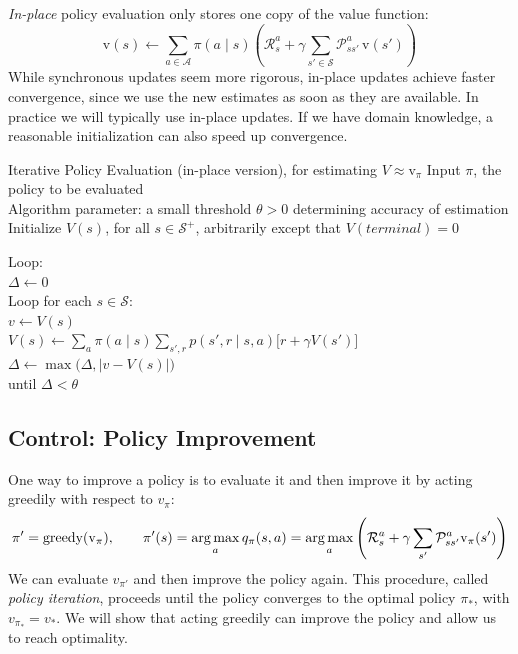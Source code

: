 \emph{In-place} policy evaluation only stores one copy of the value
function:
\[
  \mathrm{v}(s) \leftarrow \sum_{a \in \mathcal{A}}\pi(a\mid s)
  \left( \mathcal{R}_s^a + \gamma \sum_{s' \in \mathcal{S}}
  \mathcal{P}_{ss'}^a \, \mathrm{v}(s') \right)
\]
While synchronous updates seem more rigorous, in-place updates achieve faster convergence, since we use the new estimates as soon as they are available. In practice we will typically use in-place updates. If we have domain knowledge, a reasonable initialization can also speed up convergence.
\begin{algobox}{Iterative Policy Evaluation (in-place version), for estimating $V \approx \mathrm{v}_\pi$}
Input $\pi$, the policy to be evaluated\\
Algorithm parameter: a small threshold $\theta > 0$ determining accuracy of estimation\\
Initialize $V(s)$, for all $s \in \mathcal{S}^+$, arbitrarily except that
$V(\mathit{terminal}) = 0$

\medskip
Loop:\\
\hspace*{1.5em}$\Delta \leftarrow 0$\\
\hspace*{1.5em}Loop for each $s \in \mathcal{S}$:\\
\hspace*{3em}$v \leftarrow V(s)$\\
\hspace*{3em}$V(s) \leftarrow \sum_a \pi(a \mid s) \sum_{s',r} p(s',r \mid s,a)
  \bigl[r + \gamma V(s')\bigr]$\\
\hspace*{3em}$\Delta \leftarrow \max\bigl(\Delta, \lvert v - V(s) \rvert\bigr)$\\
until $\Delta < \theta$
\end{algobox}

\subsection{Control: Policy Improvement}
One way to improve a policy is to evaluate it and then improve it by acting greedily with respect to $v_\pi$:
\[\pi'=\text{greedy}(\mathrm{v}_\pi),\qquad \pi'(s)=\operatorname*{arg\,max}_a q_\pi(s,a)=\operatorname*{arg\,max}_a\left(\mathcal{R}_s^a+\gamma\sum_{s'}\mathcal{P}_{ss'}^a\mathrm{v}_\pi(s')\right)\]
We can evaluate $v_{\pi'}$ and then improve the policy again. This procedure, called \textit{policy iteration}, proceeds until the policy converges to the optimal policy $\pi_*$, with $v_{\pi_*}=v_*$.
We will show that acting greedily can improve the policy and allow us to reach optimality.

